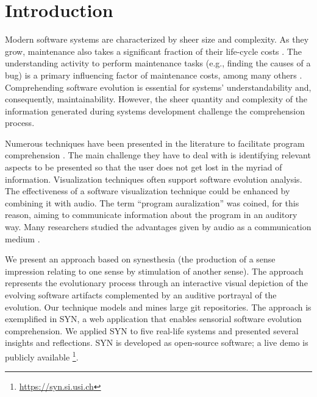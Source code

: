 \documentclass[11pt,twoside,english,singlespacing,headsepline,consistentlayout]{auxiliary/si-msc-thesis}
\author{Gianlorenzo Occhipinti}
\newcommand{\quotes}[1]{``#1''}
\begin{document}
\frontmatter
\pagestyle{plain}




\mainmatter
 
\pagestyle{thesis} 



\section*{Introduction}
Modern software systems are characterized by sheer size and complexity. As they grow, maintenance also takes a significant fraction of their life-cycle costs \cite{Davis1995, Sommerville1995, Erlikh2000, seacord2003}. The understanding activity to perform maintenance tasks (e.g., finding the causes of a bug) is a primary influencing factor of maintenance costs, among many others \cite{Corbi1989}.
Comprehending software evolution is essential for systems' understandability and, consequently, maintainability. However, the sheer quantity and complexity of the information generated during systems development challenge the comprehension process.

Numerous techniques have been presented in the literature to facilitate program comprehension \cite{Lanza2001, DAmbros2006, Steinbrueckner2010, Wettel2011, Alexandru2019, SoftwareEvolution}. The main challenge they have to deal with is identifying relevant aspects to be presented so that the user does not get lost in the myriad of information. Visualization techniques often support software evolution analysis.
The effectiveness of a software visualization technique could be enhanced by combining it with audio. The term \quotes{program auralization} was coined, for this reason, aiming to communicate information about the program in an auditory way.
Many researchers studied the advantages given by audio as a communication medium \cite{Alty1995}.

We present an approach based on synesthesia (the production of a sense impression relating to one sense by stimulation of another sense). The approach represents the evolutionary process through an interactive visual depiction of the evolving software artifacts complemented by an auditive portrayal of the evolution. Our technique models and mines large git repositories.
The approach is exemplified in SYN, a web application that enables sensorial software evolution comprehension.
We applied SYN to five real-life systems and presented several insights and reflections. SYN is developed as open-source software; a live demo is publicly available \footnote{\url{https://syn.si.usi.ch}}.
\end{document}
